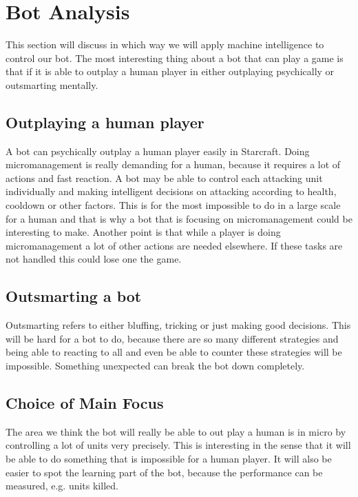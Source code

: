 \section{Bot Analysis}
	This section will discuss in which way we will apply machine intelligence to control our bot. The most interesting thing about a bot that can play a game is that if it is able to outplay a 
	human player in either outplaying psychically or outsmarting mentally. 
	
	\subsection*{Outplaying a human player}
		A bot can psychically outplay a human player easily in Starcraft. 
		Doing micromanagement is really demanding for a human, because it requires a lot of actions and fast reaction. A bot may be able to control each 
		attacking unit individually and making intelligent decisions on attacking according to health, cooldown or other factors. This is for the most 
		impossible to do in a large scale for a human and that is why a bot that is focusing on micromanagement could be interesting to make. Another point 
		is that while a player is doing micromanagement a lot of other actions are needed elsewhere. If these tasks are not handled this could lose one the game.
		
	\subsection*{Outsmarting a bot}
		Outsmarting refers to either bluffing, tricking or just making good decisions. This will be hard for a bot to do, because there are so many 
		different strategies and being able to reacting to all and even be able to counter these strategies will be impossible. Something unexpected 
		can break the bot down completely.

\subsection{Choice of Main Focus}
	The area we think the bot will really be able to out play a human is in micro by controlling a lot of units very precisely. This is interesting in the sense that it will be able to do something that is impossible for a human player. It will also be easier to spot the learning part of the bot, because the performance can be measured, e.g. units killed.